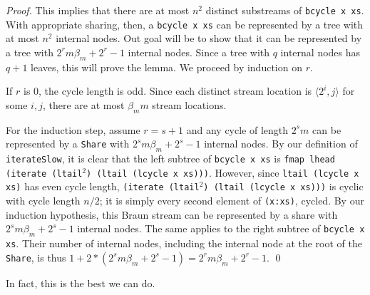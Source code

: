 \documentclass{llncs}
\begin{document}
\begin{proof}
This implies that there are at most $n^2$ distinct substreams of {\tt bcycle x xs}.
With appropriate sharing, then, a {\tt bcycle x xs} can be represented by a tree with at most $n^2$ internal nodes.
Out goal will be to show that it can be represented by a tree with $2^r m \beta_m + 2^r - 1$ internal nodes.
Since a tree with $q$ internal nodes has $q+1$ leaves, this will prove the lemma.
We proceed by induction on $r$. 

If $r$ is $0$, the cycle length is odd.
Since each distinct stream location is $\langle 2^i,j \rangle$ for some $i, j$, there are at most $\beta_m m$ stream locations.

For the induction step, assume $r = s+1$ and any cycle of length $2^s m$ can be represented by a {\tt Share} with $2^s m \beta_m + 2^s - 1$ internal nodes.
By our definition of {\tt iterateSlow}, it is clear that the left subtree of {\tt bcycle x xs} is {\tt fmap lhead (iterate (ltail}$^2${\tt ) (ltail (lcycle x xs)))}.
However, since {\tt ltail (lcycle x xs)} has even cycle length, {\tt (iterate (ltail}$^2${\tt ) (ltail (lcycle x xs)))} is cyclic with cycle length $n/2$;
it is simply every second element of {\tt (x:xs)}, cycled.
By our induction hypothesis, this Braun stream can be represented by a share with $2^s m \beta_m + 2^s - 1$ internal nodes.
The same applies to the right subtree of {\tt bcycle x xs}.
Their number of internal nodes, including the internal node at the root of the {\tt Share}, is thus $1+2*(2^s m \beta_m + 2^s - 1) = 2^r m \beta_m + 2^r - 1$.
\qed
\end{proof}

In fact, this is the best we can do.
\end{document}

